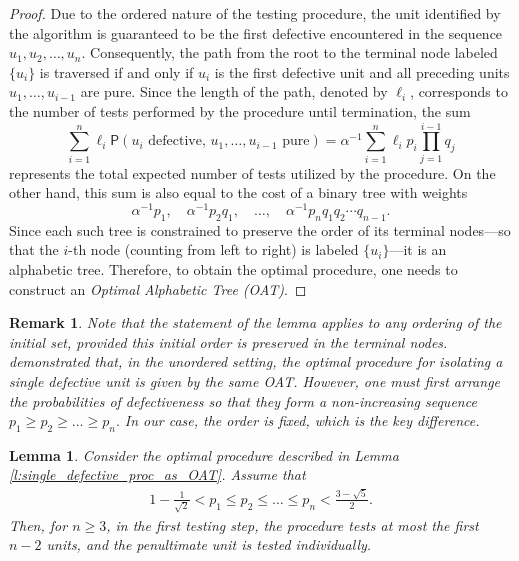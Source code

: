 \documentclass[12pt]{article}
\newtheorem{lem}{Lemma}
\newtheorem{remark}{Remark}
\begin{document}
\begin{proof}
Due to the ordered nature of the testing procedure, the unit identified by the algorithm is guaranteed to be the first defective encountered in the sequence \( u_1, u_2, \dots, u_n \). Consequently, the path from the root to the terminal node labeled \( \{u_i\} \) is traversed if and only if \( u_i \) is the first defective unit and all preceding units \( u_1, \dots, u_{i-1} \) are pure. Since the length of the path, denoted by \(\ell_i\), corresponds to the number of tests performed by the procedure until termination, the sum
\begin{equation*}
    \sum_{i=1}^n\ell_i \textsf{P}(u_i\text{ defective, }u_1,\dots,u_{i-1}\text{ pure})=
    \alpha^{-1}\sum_{i=1}^n\ell_ip_i\prod_{j=1}^{i-1}q_j
\end{equation*}
represents the total expected number of tests utilized by the procedure.
On the other hand, this sum is also equal to the cost of a binary tree with weights
\[
\alpha^{-1} p_1, \quad \alpha^{-1} p_2 q_1, \quad \dots, \quad \alpha^{-1} p_n q_1 q_2 \cdots q_{n-1}.
\]
Since each such tree is constrained to preserve the order of its terminal nodes—so that the \(i\)-th node (counting from left to right) is labeled \(\{u_i\}\)—it is an alphabetic tree. Therefore, to obtain the optimal procedure, one needs to construct an \emph{Optimal Alphabetic Tree (OAT)}.
\end{proof}

\begin{remark}
Note that the statement of the lemma applies to any ordering of the initial set, provided this initial order is preserved in the terminal nodes. \cite{GH1974} demonstrated that, in the unordered setting, the optimal procedure for isolating a single defective unit is given by the same OAT. However, one must first arrange the probabilities of defectiveness so that they form a non-increasing sequence \(p_1 \geq p_2 \geq \dots \geq p_n.\)
In our case, the order is fixed, which is the key difference.
\end{remark}


\begin{lem}\label{l:OAT_structure}
Consider the optimal procedure described in Lemma \ref{l:single_defective_proc_as_OAT}. Assume that
\begin{align}
\label{eq:con1}
1 - \frac{1}{\sqrt{2}} < p_1 \leq p_2 \leq \dots \leq p_n < \frac{3 - \sqrt{5}}{2}.
\end{align}
Then, for \( n \geq 3 \), in the first testing step, the procedure tests at most the first \( n - 2 \) units, and the penultimate unit is tested individually.
\end{lem}
\end{document}
